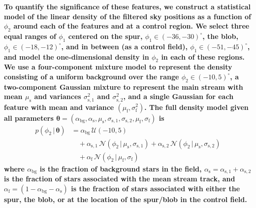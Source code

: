 \documentclass[modern]{aastex62}
\newcommand{\bs}[1]{\boldsymbol{#1}}
\newcommand{\given}{\,|\,}
\newcommand{\changes}[1]{{\textbf{#1}}}
\begin{document}
\changes{
To quantify the significance of these features, we construct a statistical model of the linear density of the filtered sky positions as a function of $\phi_2$ around each of the features and at a control region.
We select three equal ranges of $\phi_1$ centered on the spur, $\phi_1 \in (-36, -30)^\circ$, the blob, $\phi_1 \in (-18, -12)^\circ$, and in between (as a control field), $\phi_1 \in (-51, -45)^\circ$, and model the one-dimensional density in $\phi_2$ in each of these regions. %
We use a four-component mixture model to represent the density consisting of a uniform background over the range $\phi_2 \in (-10, 5)^\circ$, a two-component Gaussian mixture to represent the main stream with mean $\mu_{\textrm{s}}$ and variances $\sigma_{\textrm{s}, 1}^2$ and $\sigma_{\textrm{s}, 2}^2$, and a single Gaussian for each feature with mean and variance $(\mu_{\textrm{f}}, \sigma_{\textrm{f}}^2)$.
The full density model given all parameters $\bs{\theta} = (\alpha_{\textrm{bg}}, \alpha_{\textrm{s}}, \mu_{\textrm{s}}, \sigma_{\textrm{s}, 1}, \sigma_{\textrm{s}, 2}, \mu_{\textrm{f}}, \sigma_{\textrm{f}})$ is
\begin{equation}
    \begin{split}
    p(\phi_2 \given \bs{\theta}) &=
            \alpha_{\textrm{bg}} \, \mathcal{U}(-10, 5) \\ & \quad +
            \alpha_{\textrm{s}, 1} \, \mathcal{N}(\phi_2 \given \mu_{\textrm{s}}, \sigma_{\textrm{s}, 1}) +
            \alpha_{\textrm{s}, 2} \, \mathcal{N}(\phi_2 \given \mu_{\textrm{s}}, \sigma_{\textrm{s}, 2}) \\ & \quad +
            \alpha_{\textrm{f}} \,
                \mathcal{N}(\phi_2 \given \mu_{\textrm{f}}, \sigma_{\textrm{f}})
    \end{split}
\end{equation}
where $\alpha_{\textrm{bg}}$ is the fraction of background stars in the field, $\alpha_{\textrm{s}} = \alpha_{\textrm{s}, 1} + \alpha_{\textrm{s}, 2}$ is the fraction of stars associated with the mean stream track, and $\alpha_{\textrm{f}} = (1 - \alpha_{\textrm{bg}} - \alpha_{\textrm{s}})$ is the fraction of stars associated with either the spur, the blob, or at the location of the spur/blob in the control field.
}
\end{document}
